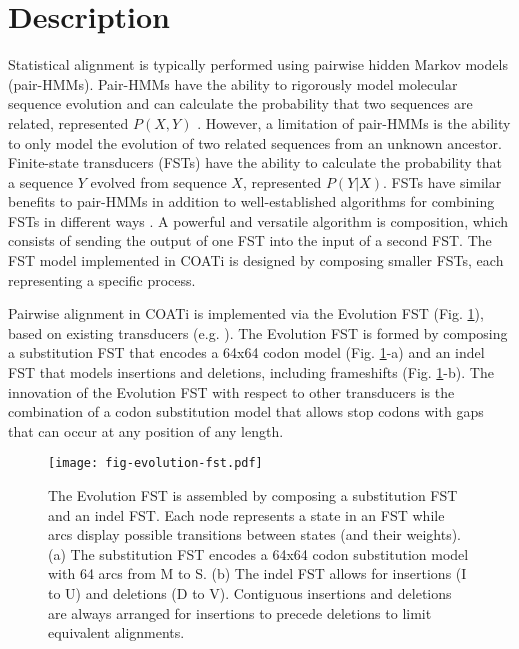 \section{Description}

Statistical alignment is typically performed using pairwise hidden Markov
models (pair-HMMs).
Pair-HMMs have the ability to rigorously model molecular sequence evolution and
can calculate the probability that two sequences are related, represented
$P(X, Y)$ \parencite{yoon_2009_hmm}.
However, a limitation of pair-HMMs is the ability to only model the evolution of
two related sequences from an unknown ancestor.
Finite-state transducers (FSTs) have the ability to calculate the probability
that a sequence $Y$ evolved from sequence $X$, represented $P(Y | X)$.
FSTs have similar benefits to pair-HMMs in addition to
well-established algorithms for combining FSTs in different ways
\parencite{bradley2007transducers}.
A powerful and versatile algorithm is composition, which consists of sending the
output of one FST into the input of a second FST.
The FST model implemented in COATi is designed by composing smaller FSTs, each
representing a specific process.

Pairwise alignment in COATi is implemented via the Evolution FST (Fig.
\ref{fig:evolution-fst}), based on existing transducers (e.g.
\cite{holmes2001evolutionary}).
The Evolution FST is formed by composing a substitution FST that encodes a 64x64
codon model (Fig. \ref{fig:evolution-fst}-a) and an indel FST that models
insertions and deletions, including frameshifts (Fig. \ref{fig:evolution-fst}-b).
The innovation of the Evolution FST with respect to other transducers is the
combination of a codon substitution model that allows stop codons with gaps that
can occur at any position of any length.

\begin{figure}[h!]
\begin{framed}
\centering
    \texttt{[image: fig-evolution-fst.pdf]}
    \caption{The Evolution FST is assembled by composing a substitution FST and
    an indel FST. Each node represents a state in an FST while arcs display
    possible transitions between states (and their weights). (a) The
    substitution FST encodes a 64x64 codon substitution model with 64 arcs from
    M to S. (b) The indel FST allows for insertions (I to U) and deletions
    (D to V). Contiguous insertions and deletions are always arranged for
    insertions to precede deletions to limit equivalent alignments.}
    \label{fig:evolution-fst}
\end{framed}
\end{figure}


